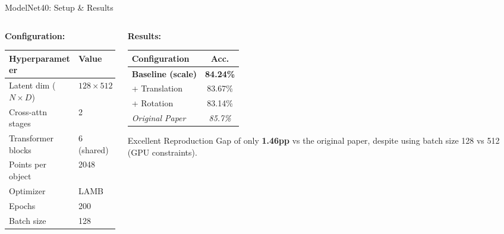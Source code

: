 \documentclass[aspectratio=169,11pt]{beamer}
\begin{document}
\begin{frame}[shrink=5]{ModelNet40: Setup \& Results}
  \begin{columns}[T]
    \begin{column}{0.48\textwidth}
      \textbf{Configuration:}
      \begin{table}
        \centering\small
        \begin{tabular}{ll}
          \toprule
          \textbf{Hyperparameter} & \textbf{Value} \\
          \midrule
          Latent dim ($N \times D$) & $128 \times 512$ \\
          Cross-attn stages & 2 \\
          Transformer blocks & 6 (shared) \\
          Points per object & 2048 \\
          Optimizer & LAMB \\
          Epochs & 200 \\
          Batch size & 128 \\
          \bottomrule
        \end{tabular}
      \end{table}
    \end{column}
    \begin{column}{0.48\textwidth}
      \textbf{Results:}
      \begin{table}
        \centering\small
        \begin{tabular}{lc}
          \toprule
          \textbf{Configuration} & \textbf{Acc.} \\
          \midrule
          \textbf{Baseline (scale)} & \textbf{84.24\%} \\
          + Translation & 83.67\% \\
          + Rotation & 83.14\% \\
          \midrule
          \textit{Original Paper} & \textit{85.7\%} \\
          \bottomrule
        \end{tabular}
      \end{table}

      \vspace{0.3em}
      \begin{exampleblock}{Excellent Reproduction}
        Gap of only \textbf{1.46pp} vs the original paper, despite using batch size 128 vs 512 (GPU constraints).
      \end{exampleblock}
    \end{column}
  \end{columns}
\end{frame}
\end{document}
